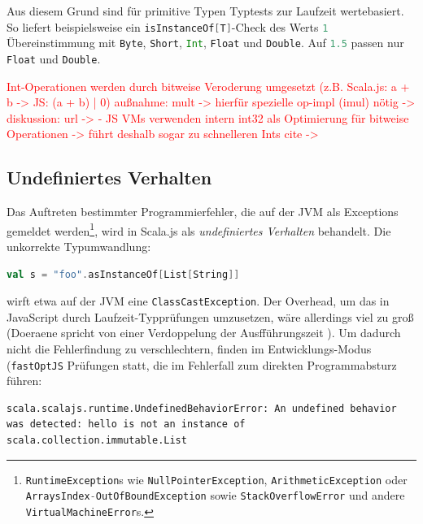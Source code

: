 \documentclass[a4paper, 12pt, hidelinks, listof=totoc, listoftables=totoc, bibliography=totoc]{scrreprt}
\newcommand{\code}[1]{\lstinline[language=Scala, style=inline]|#1|}
\newcommand{\scala}[1]{\lstinline[language=Scala, style=inline]|#1|}
\newcommand{\TODO}[1]{\textcolor{red}{#1}\newline}
\begin{document}
Aus diesem Grund sind für primitive Typen Typtests zur Laufzeit wertebasiert. So liefert beispielsweise ein \scala{isInstanceOf[T]}-Check des Werts \scala{1} Übereinstimmung mit \scala{Byte}, \scala{Short}, \scala{Int}, \scala{Float} und \scala{Double}. Auf \scala{1.5} passen nur \scala{Float} und \scala{Double}.\cite{scalajs.DSS}

\TODO{Int-Operationen werden durch bitweise Veroderung umgesetzt (z.B. Scala.js: a + b -> JS: (a + b) | 0)}
\TODO{außnahme: mult -> hierfür spezielle op-impl (imul) nötig  -> diskussion: url -> %
}
\TODO{- JS VMs verwenden intern int32 als Optimierung für bitweise Operationen}
\TODO{-> führt deshalb sogar zu schnelleren Ints}
\TODO{cite -> %
}



\subsection{Undefiniertes Verhalten}\label{subsec:undefined-behavior}

Das Auftreten bestimmter Programmierfehler, die auf der JVM als Exceptions gemeldet werden\footnote{\scala{RuntimeException}s wie \scala{NullPointerException}, \scala{ArithmeticException} oder \scala{ArraysIndex-OutOfBoundException} sowie \scala{StackOverflowError} und andere \scala{VirtualMachineError}s.},
wird in Scala.js als \emph{undefiniertes Verhalten} behandelt. Die unkorrekte Typumwandlung:

\begin{lstlisting}[language=Scala, style=snippet]
val s = "foo".asInstanceOf[List[String]]
\end{lstlisting}

wirft etwa auf der JVM eine \scala{ClassCastException}. Der Overhead, um das in JavaScript durch Laufzeit-Typprüfungen umzusetzen, wäre allerdings viel zu groß (Doeraene spricht von einer Verdoppelung der Ausfführungszeit \cite[Folie 23 ff., Min. 15]{doeraene2015.SSP}). Um dadurch nicht die Fehlerfindung zu verschlechtern, finden im Entwicklungs-Modus (\code{fastOptJS} Prüfungen statt, die im Fehlerfall zum direkten Programmabsturz führen:

\begin{lstlisting}[style=snippet]
scala.scalajs.runtime.UndefinedBehaviorError: An undefined behavior was detected: hello is not an instance of scala.collection.immutable.List
\end{lstlisting}
\end{document}
